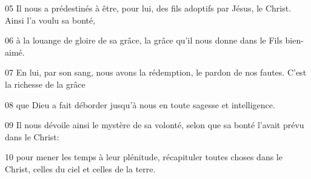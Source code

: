 
05 Il nous a prédestinés à être, pour lui, des fils adoptifs par Jésus, le Christ. Ainsi l’a voulu sa bonté,

06 à la louange de gloire de sa grâce, la grâce qu’il nous donne dans le Fils bien-aimé.

07 En lui, par son sang, nous avons la rédemption, le pardon de nos fautes. C’est la richesse de la grâce

08 que Dieu a fait déborder jusqu’à nous en toute sagesse et intelligence.

09 Il nous dévoile ainsi le mystère de sa volonté, selon que sa bonté l’avait prévu dans le Christ:

10 pour mener les temps à leur plénitude, récapituler toutes choses dans le Christ, celles du ciel et celles de la terre.
